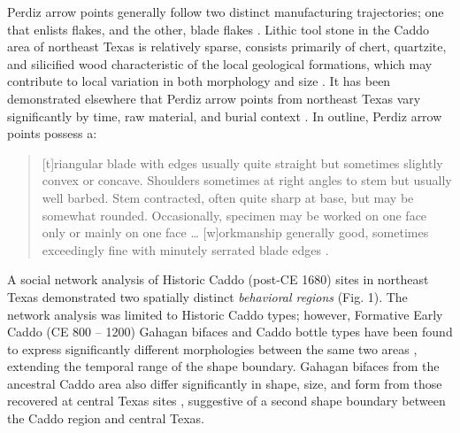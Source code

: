 \documentclass[smallextended]{svjour3}       %
\begin{document}
Perdiz arrow points generally follow two distinct manufacturing
trajectories; one that enlists flakes, and the other, blade flakes
\cite{RN8999,RN9361,RN9000,RN9364}. Lithic tool stone in the Caddo area
of northeast Texas is relatively sparse, consists primarily of chert,
quartzite, and silicified wood characteristic of the local geological
formations, which may contribute to local variation in both morphology
and size \cite{RN9364,RN439}. It has been demonstrated elsewhere that
Perdiz arrow points from northeast Texas vary significantly by time, raw
material, and burial context \cite{RN9364}. In outline, Perdiz arrow
points possess a:

\begin{quote}
{[}t{]}riangular blade with edges usually quite straight but sometimes
slightly convex or concave. Shoulders sometimes at right angles to stem
but usually well barbed. Stem contracted, often quite sharp at base, but
may be somewhat rounded. Occasionally, specimen may be worked on one
face only or mainly on one face \ldots{} {[}w{]}orkmanship generally
good, sometimes exceedingly fine with minutely serrated blade edges
\cite[504]{RN5769}.
\end{quote}

A social network analysis of Historic Caddo (post-CE 1680) sites in
northeast Texas demonstrated two spatially distinct \emph{behavioral
regions} \cite{RN8031} (Fig. 1). The network analysis was limited to
Historic Caddo types; however, Formative Early Caddo (CE 800 -- 1200)
Gahagan bifaces and Caddo bottle types have been found to express
significantly different morphologies between the same two areas
\cite{RN8074,RN7927,RN8370,RN8312}, extending the temporal range of the
shape boundary. Gahagan bifaces from the ancestral Caddo area also
differ significantly in shape, size, and form from those recovered at
central Texas sites \cite{RN8322}, suggestive of a second shape boundary
between the Caddo region and central Texas.
\end{document}
